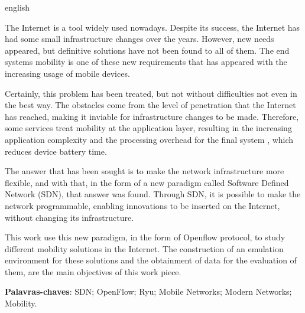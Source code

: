 \documentclass[	12pt, Times, openright, twoside, a4paper, english, brazil]{abntex2}
\begin{document}
\begin{resumo}[Abstract]
 \begin{otherlanguage*}{english}

\par The Internet is a tool widely used nowadays. Despite its success, the Internet has had some small infrastructure changes over the years. However, new needs appeared, but definitive solutions have not been found to all of them. The end systems mobility is one of these new requirements that has appeared with the increasing usage of mobile devices.
\par Certainly, this problem has been treated, but not without difficulties not even in the best way. The obstacles come from the level of penetration that the Internet has reached, making it inviable for infrastructure changes to be made. Therefore, some services treat mobility at the application layer, resulting in the increasing application complexity and the processing overhead for the final system , which reduces device battery time.
\par The answer that has been sought is to make the network infrastructure more flexible, and with that, in the form of a new paradigm called Software Defined Network (SDN), that answer was found. Through SDN, it is possible to make the network programmable, enabling innovations to be inserted on the Internet, without changing its infrastructure.
\par This work use this new paradigm, in the form of Openflow protocol, to study different mobility solutions in the Internet. The construction of an emulation environment for these solutions and the obtainment of data for the evaluation of them, are the main objectives of this work piece.

   \vspace{\onelineskip}
 
   \noindent 
    \textbf{Palavras-chaves}: SDN; OpenFlow; Ryu; Mobile Networks; Modern Networks; Mobility.
 \end{otherlanguage*}
\end{resumo}

\listoffigures*
\cleardoublepage

\listoftables*
\cleardoublepage
\end{document}
